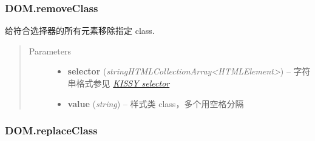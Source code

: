 \documentclass[letterpaper,10pt,english]{sphinxmanual}
\begin{document}
\subsubsection{DOM.removeClass}
\label{api/core/dom/removeClass:dom-removeclass}\label{api/core/dom/removeClass::doc}

\begin{fulllineitems}
\label{api/core/dom/removeClass:DOM.removeClass}
给符合选择器的所有元素移除指定 class.
\begin{quote}\begin{description}
\item[{Parameters}] \leavevmode\begin{itemize}
\item {}
\textbf{selector} (\emph{string\textbar{}HTMLCollection\textbar{}Array\textless{}HTMLElement\textgreater{}}) -- 字符串格式参见 {\hyperref[api/core/dom/selector:dom-selector]{\emph{KISSY selector}}}

\item {}
\textbf{value} (\emph{string}) -- 样式类 class，多个用空格分隔

\end{itemize}

\end{description}\end{quote}

\end{fulllineitems}



\subsubsection{DOM.replaceClass}
\label{api/core/dom/replaceClass::doc}\label{api/core/dom/replaceClass:dom-replaceclass}
\end{document}
